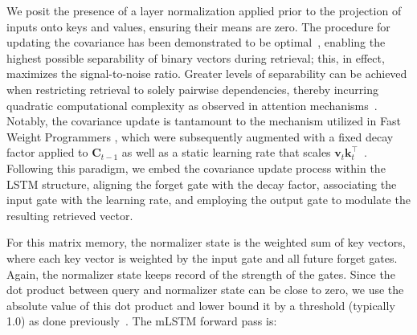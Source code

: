 We posit the presence of a layer normalization applied prior to the projection of inputs onto keys and values, ensuring their means are zero. The procedure for updating the covariance has been demonstrated to be optimal~\citep{Dayan:91}, enabling the highest possible separability of binary vectors during retrieval; this, in effect, maximizes the signal-to-noise ratio. Greater levels of separability can be achieved when restricting retrieval to solely pairwise dependencies, thereby incurring quadratic computational complexity as observed in attention mechanisms~\citep{Krotov:16,Krotov:17,Ramsauer:21}. Notably, the covariance update is tantamount to the mechanism utilized in Fast Weight Programmers \citep{Schmidhuber:92ncfastweights,Schlag:21}, which were subsequently augmented with a fixed decay factor applied to $\mathbf{C}_{t-1}$ as well as a static learning rate that scales 
$\mathbf{v}_{t} \mathbf{k}_t ^\top$~\citep{Ba:16}.
Following this paradigm, we embed the covariance update process within the LSTM structure, aligning the forget gate with the decay factor, associating the input gate with the learning rate, and employing the output gate to modulate the resulting retrieved vector.

For this matrix memory, the normalizer state is the weighted sum of key vectors, where each key vector is weighted by the input gate and all future forget gates. Again, the normalizer state keeps record of the strength of the gates. Since the dot product between query and normalizer state can be close to zero, we use the absolute value of this dot product and lower bound it by a threshold (typically 1.0) as done previously~\citep{Sun:23arxiv}. The mLSTM forward pass is:

